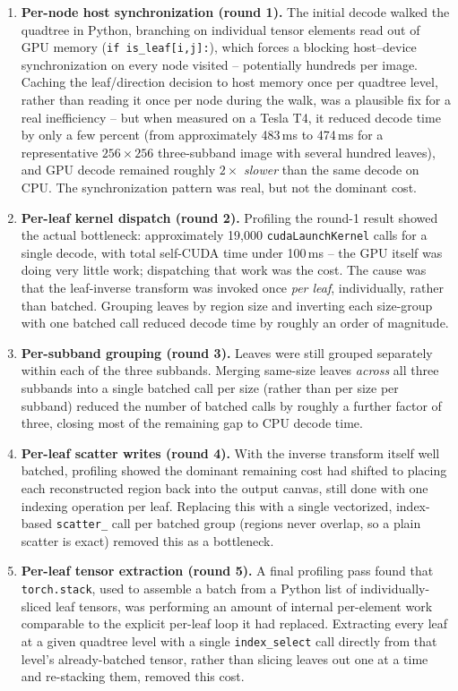 \documentclass[11pt]{article}
\begin{document}
\begin{enumerate}
\item \textbf{Per-node host synchronization (round 1).} The initial decode
  walked the quadtree in Python, branching on individual tensor elements
  read out of GPU memory (\texttt{if is\_leaf[i,j]:}), which forces a
  blocking host--device synchronization on every node visited --
  potentially hundreds per image. Caching the leaf/direction decision to
  host memory once per quadtree level, rather than reading it once per node
  during the walk, was a plausible fix for a real inefficiency -- but when
  measured on a Tesla T4, it reduced decode time by only a few percent (from
  approximately 483\,ms to 474\,ms for a representative $256\times256$
  three-subband image with several hundred leaves), and GPU decode remained
  roughly $2\times$ \emph{slower} than the same decode on CPU. The
  synchronization pattern was real, but not the dominant cost.
\item \textbf{Per-leaf kernel dispatch (round 2).} Profiling the round-1
  result showed the actual bottleneck: approximately 19{,}000
  \texttt{cudaLaunchKernel} calls for a single decode, with total
  self-CUDA time under 100\,ms -- the GPU itself was doing very little work;
  dispatching that work was the cost. The cause was that the leaf-inverse
  transform was invoked once \emph{per leaf}, individually, rather than
  batched. Grouping leaves by region size and inverting each size-group with
  one batched call reduced decode time by roughly an order of magnitude.
\item \textbf{Per-subband grouping (round 3).} Leaves were still grouped
  separately within each of the three subbands. Merging same-size leaves
  \emph{across} all three subbands into a single batched call per size
  (rather than per size per subband) reduced the number of batched calls by
  roughly a further factor of three, closing most of the remaining gap to
  CPU decode time.
\item \textbf{Per-leaf scatter writes (round 4).} With the inverse transform
  itself well batched, profiling showed the dominant remaining cost had
  shifted to placing each reconstructed region back into the output canvas,
  still done with one indexing operation per leaf. Replacing this with a
  single vectorized, index-based \texttt{scatter\_} call per batched group
  (regions never overlap, so a plain scatter is exact) removed this as a
  bottleneck.
\item \textbf{Per-leaf tensor extraction (round 5).} A final profiling pass
  found that \texttt{torch.stack}, used to assemble a batch from a Python
  list of individually-sliced leaf tensors, was performing an amount of
  internal per-element work comparable to the explicit per-leaf loop it had
  replaced. Extracting every leaf at a given quadtree level with a single
  \texttt{index\_select} call directly from that level's already-batched
  tensor, rather than slicing leaves out one at a time and re-stacking them,
  removed this cost.
\end{enumerate}
\end{document}
